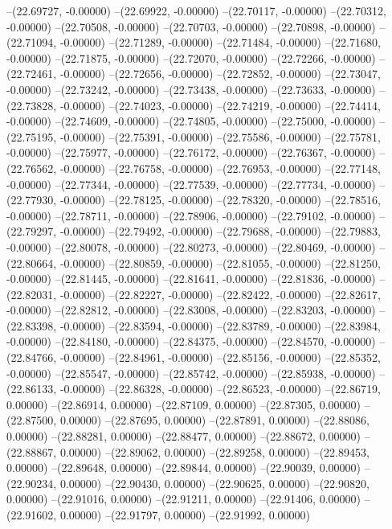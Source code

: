 --(22.69727, -0.00000)
--(22.69922, -0.00000)
--(22.70117, -0.00000)
--(22.70312, -0.00000)
--(22.70508, -0.00000)
--(22.70703, -0.00000)
--(22.70898, -0.00000)
--(22.71094, -0.00000)
--(22.71289, -0.00000)
--(22.71484, -0.00000)
--(22.71680, -0.00000)
--(22.71875, -0.00000)
--(22.72070, -0.00000)
--(22.72266, -0.00000)
--(22.72461, -0.00000)
--(22.72656, -0.00000)
--(22.72852, -0.00000)
--(22.73047, -0.00000)
--(22.73242, -0.00000)
--(22.73438, -0.00000)
--(22.73633, -0.00000)
--(22.73828, -0.00000)
--(22.74023, -0.00000)
--(22.74219, -0.00000)
--(22.74414, -0.00000)
--(22.74609, -0.00000)
--(22.74805, -0.00000)
--(22.75000, -0.00000)
--(22.75195, -0.00000)
--(22.75391, -0.00000)
--(22.75586, -0.00000)
--(22.75781, -0.00000)
--(22.75977, -0.00000)
--(22.76172, -0.00000)
--(22.76367, -0.00000)
--(22.76562, -0.00000)
--(22.76758, -0.00000)
--(22.76953, -0.00000)
--(22.77148, -0.00000)
--(22.77344, -0.00000)
--(22.77539, -0.00000)
--(22.77734, -0.00000)
--(22.77930, -0.00000)
--(22.78125, -0.00000)
--(22.78320, -0.00000)
--(22.78516, -0.00000)
--(22.78711, -0.00000)
--(22.78906, -0.00000)
--(22.79102, -0.00000)
--(22.79297, -0.00000)
--(22.79492, -0.00000)
--(22.79688, -0.00000)
--(22.79883, -0.00000)
--(22.80078, -0.00000)
--(22.80273, -0.00000)
--(22.80469, -0.00000)
--(22.80664, -0.00000)
--(22.80859, -0.00000)
--(22.81055, -0.00000)
--(22.81250, -0.00000)
--(22.81445, -0.00000)
--(22.81641, -0.00000)
--(22.81836, -0.00000)
--(22.82031, -0.00000)
--(22.82227, -0.00000)
--(22.82422, -0.00000)
--(22.82617, -0.00000)
--(22.82812, -0.00000)
--(22.83008, -0.00000)
--(22.83203, -0.00000)
--(22.83398, -0.00000)
--(22.83594, -0.00000)
--(22.83789, -0.00000)
--(22.83984, -0.00000)
--(22.84180, -0.00000)
--(22.84375, -0.00000)
--(22.84570, -0.00000)
--(22.84766, -0.00000)
--(22.84961, -0.00000)
--(22.85156, -0.00000)
--(22.85352, -0.00000)
--(22.85547, -0.00000)
--(22.85742, -0.00000)
--(22.85938, -0.00000)
--(22.86133, -0.00000)
--(22.86328, -0.00000)
--(22.86523, -0.00000)
--(22.86719, 0.00000)
--(22.86914, 0.00000)
--(22.87109, 0.00000)
--(22.87305, 0.00000)
--(22.87500, 0.00000)
--(22.87695, 0.00000)
--(22.87891, 0.00000)
--(22.88086, 0.00000)
--(22.88281, 0.00000)
--(22.88477, 0.00000)
--(22.88672, 0.00000)
--(22.88867, 0.00000)
--(22.89062, 0.00000)
--(22.89258, 0.00000)
--(22.89453, 0.00000)
--(22.89648, 0.00000)
--(22.89844, 0.00000)
--(22.90039, 0.00000)
--(22.90234, 0.00000)
--(22.90430, 0.00000)
--(22.90625, 0.00000)
--(22.90820, 0.00000)
--(22.91016, 0.00000)
--(22.91211, 0.00000)
--(22.91406, 0.00000)
--(22.91602, 0.00000)
--(22.91797, 0.00000)
--(22.91992, 0.00000)
